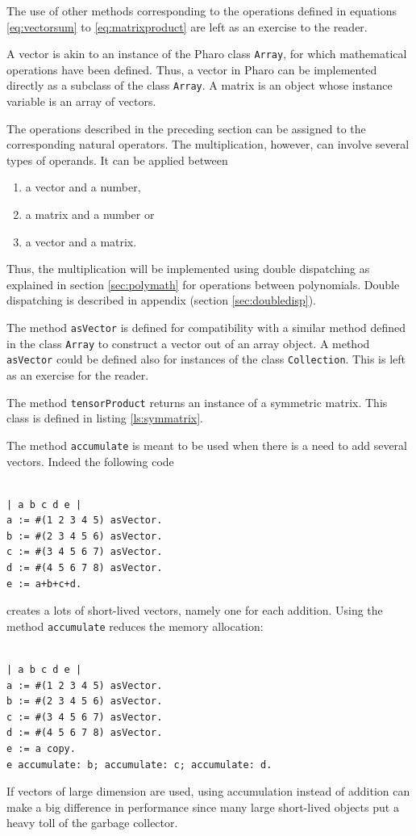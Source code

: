 \documentclass[twoside]{book}
\begin{document}
The use of other methods corresponding to the operations defined
in equations \ref{eq:vectorsum} to \ref{eq:matrixproduct} are left
as an exercise to the reader.

 A vector is akin to an instance of the
Pharo class {\tt Array}, for which mathematical operations
have been defined. Thus, a vector in Pharo can be implemented
directly as a subclass of the class {\tt Array}. A matrix is an
object whose instance variable is an array of vectors.

The operations described in the preceding section can be assigned
to the corresponding natural operators. The multiplication,
however, can involve several types of operands. It can be applied
between
\begin{enumerate}
  \item a vector and a number,
  \item a matrix and a number or
  \item a vector and a matrix.
\end{enumerate}
Thus, the multiplication will be implemented using double
dispatching as explained in section \ref{sec:polymath} for
operations between polynomials. Double dispatching is described in
appendix (\cf section \ref{sec:doubledisp}).

The method {\tt asVector} is defined for compatibility with a
similar method defined in the class {\tt Array} to construct a
vector out of an array object. A method {\tt asVector} could be
defined also for instances of the class {\tt Collection}. This is
left as an exercise for the reader.

The method {\tt tensorProduct} returns an instance of a symmetric
matrix. This class is defined in listing \ref{ls:symmatrix}.

The method {\tt accumulate} is meant to be used when there is a
need to add several vectors. Indeed the following code
\begin{codeExample}
\begin{verbatim}

| a b c d e |
a := #(1 2 3 4 5) asVector.
b := #(2 3 4 5 6) asVector.
c := #(3 4 5 6 7) asVector.
d := #(4 5 6 7 8) asVector.
e := a+b+c+d.
\end{verbatim}
\end{codeExample}
creates a lots of short-lived vectors, namely one
for each addition. Using the method {\tt accumulate} reduces the
memory allocation:
\begin{codeExample}
\begin{verbatim}

| a b c d e |
a := #(1 2 3 4 5) asVector.
b := #(2 3 4 5 6) asVector.
c := #(3 4 5 6 7) asVector.
d := #(4 5 6 7 8) asVector.
e := a copy.
e accumulate: b; accumulate: c; accumulate: d.
\end{verbatim}
\end{codeExample}
If vectors of large dimension are used, using accumulation instead
of addition can make a big difference in performance since many
large short-lived objects put a heavy toll of the garbage
collector.
\end{document}
